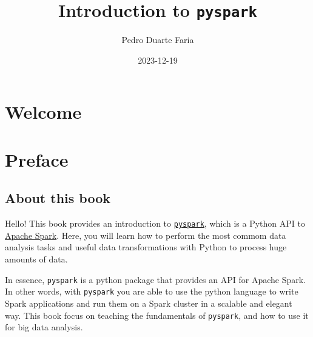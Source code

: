 \documentclass[
  11pt,
  letterpaper,
  DIV=11,
  numbers=noendperiod]{scrreprt}
\title{Introduction to \texttt{pyspark}}
\author{Pedro Duarte Faria}
\date{2023-12-19}
\renewcommand*\contentsname{Table of contents}
\newcommand\contentsname{Table of contents}
\begin{document}
\maketitle
\ifdefined\Shaded\renewenvironment{Shaded}{\begin{tcolorbox}[boxrule=0pt, sharp corners, frame hidden, interior hidden, borderline west={3pt}{0pt}{shadecolor}, enhanced, breakable]}{\end{tcolorbox}}\fi

\renewcommand*\contentsname{Table of contents}
{
\hypersetup{linkcolor=}
\setcounter{tocdepth}{2}
\tableofcontents
}

\hypertarget{welcome}{%
\chapter*{Welcome}\label{welcome}}



\hypertarget{preface}{%
\chapter*{Preface}\label{preface}}


\hypertarget{about-this-book-1}{%
\section*{About this book}\label{about-this-book-1}}


Hello! This book provides an introduction to
\href{https://spark.apache.org/docs/latest/api/python/}{\texttt{pyspark}},
which is a Python API to \href{https://spark.apache.org/}{Apache Spark}.
Here, you will learn how to perform the most commom data analysis tasks
and useful data transformations with Python to process huge amounts of
data.

In essence, \texttt{pyspark} is a python package that provides an API
for Apache Spark. In other words, with \texttt{pyspark} you are able to
use the python language to write Spark applications and run them on a
Spark cluster in a scalable and elegant way. This book focus on teaching
the fundamentals of \texttt{pyspark}, and how to use it for big data
analysis.
\end{document}
